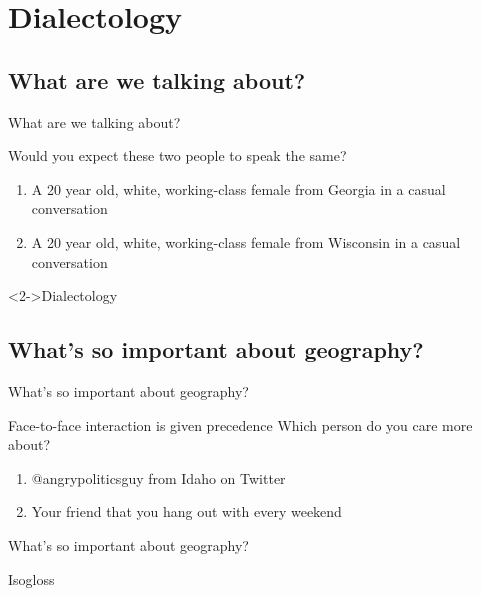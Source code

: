 \documentclass{beamer}
\subtitle[Dialectology]{Dialectology}
\newcommand{\suboneone}{What are we talking about?}
\newcommand{\subonetwo}{What's so important about geography?}
\begin{document}
  

  \section{Dialectology}
    \subsection{\suboneone}
      \begin{frame}{\suboneone}
        \begin{block}{Would you expect these two people to speak the same?}
          \begin{enumerate}
            \item A 20 year old, white, working-class female from \alert<2->{Georgia} in a casual conversation
            \item A 20 year old, white, working-class female from \alert<2->{Wisconsin} in a casual conversation
          \end{enumerate}
        \end{block}
        \begin{alertblock}<2->{Dialectology}
          
        \end{alertblock}
      \end{frame}

    \subsection{\subonetwo}
      \begin{frame}{\subonetwo}
        \begin{block}{Face-to-face interaction is given precedence}
          Which person do you care more about?
          \begin{enumerate}
            \item @angrypoliticsguy from Idaho on Twitter
            \item Your friend that you hang out with every weekend
          \end{enumerate}
        \end{block}
      \end{frame}

      \begin{frame}{\subonetwo}
        \begin{alertblock}{Isogloss}
          
        \end{alertblock}
      \end{frame}
\end{document}
